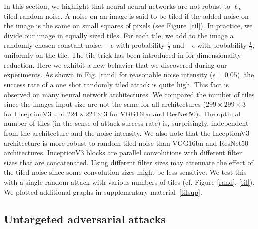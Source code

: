 In this section, we highlight that neural neural networks are not robust to $\ell_\infty$ tiled random noise. A noise on an image is said to be tiled if the added noise on the image is the same on small squares of pixels (see Figure~\ref{til}). In practice, we divide our image in equally sized tiles.  For each tile, we add to the image a randomly chosen constant noise: $+\epsilon$ with probability $\frac12$ and $-\epsilon$ with probability $\frac12$, uniformly on the tile. The tile trick has been introduced in\cite{ilyas2018black} for dimensionality reduction. Here we exhibit a new behavior that we discovered during our experiments. As shown in Fig. \ref{rand} for reasonable noise intensity ($\epsilon=0.05$), the success rate of a one shot randomly tiled attack is quite high. This fact is observed on many  neural network architectures. We compared the number of tiles since the images input size are not the same for all architectures ($299\times299\times3$ for InceptionV3 and $224\times 224\times3$ for VGG16bn and ResNet50).  The optimal number of tiles (in the sense of attack success rate) is, surprisingly, independent from the architecture and the noise intensity. We also note that the InceptionV3 architecture is more robust to random tiled noise than VGG16bn and ResNet50 architectures. InceptionV3 blocks are parallel convolutions with different filter sizes that are concatenated. Using different filter sizes may attenuate the effect of the tiled noise since some convolution sizes might be less sensitive. We test this with a single random attack with various numbers of tiles (cf. Figure \ref{rand}, \ref{til}). We plotted additional graphs in  supplementary material~\ref{tilsup}.



\subsection{Untargeted adversarial attacks}
\label{unt_sota}

